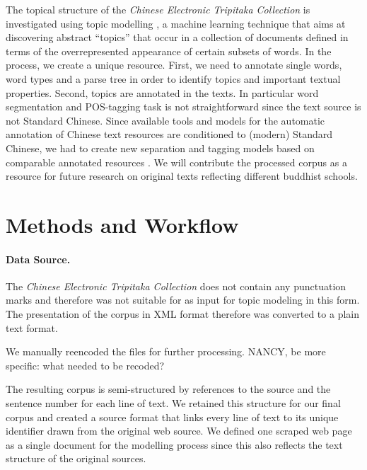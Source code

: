 \documentclass[a4paper,10pt]{article}
\newcommand{\TODO}[1]{\begingroup\color{red}#1\endgroup}
\newcommand{\NR}[1]{\begingroup\color{orange}#1\endgroup}
\begin{document}
The topical structure of the \textit{Chinese Electronic Tripitaka Collection} is investigated using topic
modelling \cite{blei2012probabilistic}, a machine learning technique that
aims at discovering abstract ``topics'' that occur in a collection of
documents defined in terms of the overrepresented appearance of certain
subsets of words. In the process, we create a unique resource. First, we
need to annotate single words, word types and a parse tree in order to
identify topics and important textual properties. Second, topics are
annotated in the texts.  In particular word segmentation and POS-tagging
task is not straightforward since the text source is not Standard
Chinese. Since available tools and models for the automatic annotation of
Chinese text resources are conditioned to \NR{(modern)} Standard Chinese,
we had to create new separation and tagging models based on comparable
annotated resources \cite{Wong:16}.  We will contribute the processed corpus
as a resource for future research on original texts reflecting different
buddhist schools.

\section{Methods and Workflow} 

\paragraph{Data Source.} The \textit{Chinese Electronic Tripitaka Collection} 
\cite{} does not contain any
  punctuation marks and therefore was not suitable for as input for topic
  modeling in this form. The presentation of the corpus in XML format
  \TODO{\cite{DaiCD}} therefore was converted to a plain text format.
  
  We manually reencoded the files for further processing.
  \TODO{NANCY, be more specific: what needed to be recoded?} 

  The resulting corpus is semi-structured by references to the source and
  the sentence number for each line of text. We retained this structure for
  our final corpus and created a source format that links every line of
  text to its unique identifier drawn from the original web source. We
  defined one scraped web page as a single document for the modelling
  process since this also reflects the text structure of the original
  sources.
    
\end{document}
